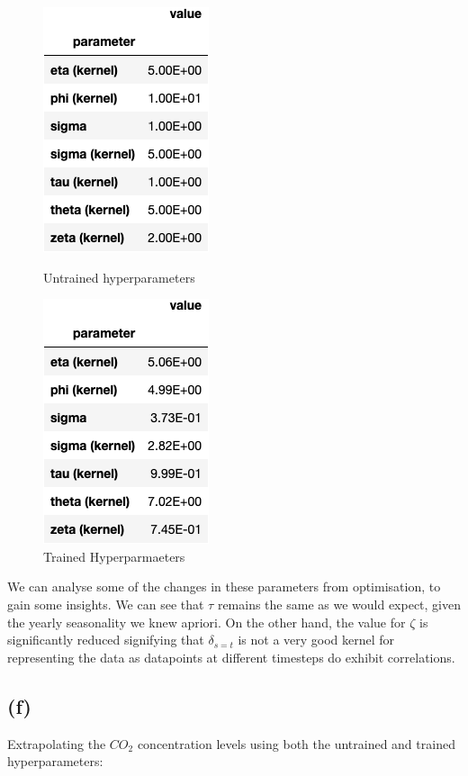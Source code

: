\documentclass[12pt]{article}
\begin{document}
\begin{figure}[h]
\centering
\begin{minipage}{.5\textwidth}
  \centering
\includegraphics[scale=0.5]{outputs/q2/f-untrained-parameters}
\caption{Untrained hyperparameters}
\label{fig:f-untrained-parameters}
\end{minipage}%
\begin{minipage}{.5\textwidth}
  \centering
\includegraphics[scale=0.5]{outputs/q2/f-trained-parameters}
\caption{Trained Hyperparmaeters}
\label{fig:f-trained-parameters}
\end{minipage}
\end{figure}

We can analyse some of the changes in these parameters from optimisation, to gain some insights.
We can see that $\tau$ remains the same as we would expect, given the yearly seasonality we knew apriori.
On the other hand, the value for $\zeta$ is significantly reduced signifying that $\delta_{s=t}$ is not a very good kernel for representing the data as datapoints at different timesteps do exhibit correlations.

\newpage
\subsection*{(f)}
Extrapolating the $CO_2$ concentration levels using both the untrained and trained hyperparameters:
\end{document}

